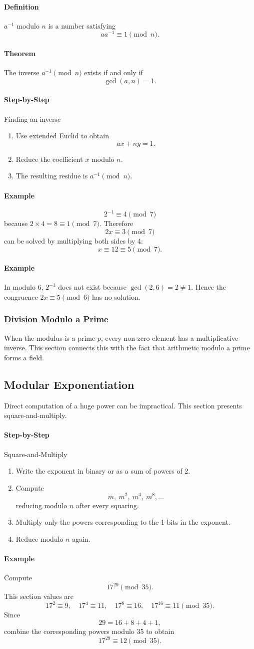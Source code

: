 \documentclass[12pt]{article}
\newcommand{\Definition}{\paragraph{Definition}}
\newcommand{\Step}{\paragraph{Step-by-Step}}
\newcommand{\Example}{\paragraph{Example}}
\newcommand{\Theorem}{\paragraph{Theorem}}
\begin{document}
\Definition $a^{-1}$ modulo $n$ is a number satisfying
\[
aa^{-1}\equiv1\pmod n.
\]

\Theorem The inverse $a^{-1}\pmod n$ exists if and only if
\[
\gcd(a,n)=1.
\]

\Step{Finding an inverse}
\begin{enumerate}
    \item Use extended Euclid to obtain
    \[
    ax+ny=1.
    \]
    \item Reduce the coefficient $x$ modulo $n$.
    \item The resulting residue is $a^{-1}\pmod n$.
\end{enumerate}

\Example
\[
2^{-1}\equiv4\pmod7
\]
because $2\times4=8\equiv1\pmod7$. Therefore
\[
2x\equiv3\pmod7
\]
can be solved by multiplying both sides by 4:
\[
x\equiv12\equiv5\pmod7.
\]

\Example In modulo 6, $2^{-1}$ does not exist because $\gcd(2,6)=2\ne1$. Hence the congruence $2x\equiv5\pmod6$ has no solution.

\subsubsection{Division Modulo a Prime}
When the modulus is a prime $p$, every non-zero element has a multiplicative inverse. This section connects this with the fact that arithmetic modulo a prime forms a field.

\subsection{Modular Exponentiation}
Direct computation of a huge power can be impractical. This section presents square-and-multiply.

\Step{Square-and-Multiply}
\begin{enumerate}
    \item Write the exponent in binary or as a sum of powers of 2.
    \item Compute
    \[
    m,\ m^2,\ m^4,\ m^8,\ldots
    \]
    reducing modulo $n$ after every squaring.
    \item Multiply only the powers corresponding to the 1-bits in the exponent.
    \item Reduce modulo $n$ again.
\end{enumerate}

\Example Compute
\[
17^{29}\pmod{35}.
\]
This section values are
\[
17^2\equiv9,
\quad17^4\equiv11,
\quad17^8\equiv16,
\quad17^{16}\equiv11\pmod{35}.
\]
Since
\[
29=16+8+4+1,
\]
combine the corresponding powers modulo 35 to obtain
\[
17^{29}\equiv12\pmod{35}.
\]
\end{document}
